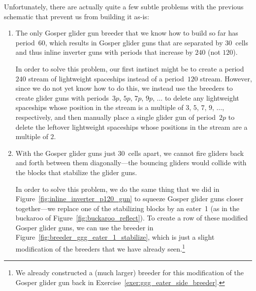 Unfortunately, there are actually quite a few subtle problems with the previous schematic that prevent us from building it as-is:\smallskip

\begin{enumerate}
	\item[1)] The only Gosper glider gun breeder that we know how to build so far has period~$60$, which results in Gosper glider guns that are separated by $30$~cells and thus inline inverter guns with periods that increase by $240$ (not $120$).
	
	In order to solve this problem, our first instinct might be to create a period~$240$ stream of lightweight spaceships instead of a period~$120$ stream. However, since we do not yet know how to do this, we instead use the breeders to create glider guns with periods~$3p$, $5p$, $7p$, $9p$, $\ldots$ to delete any lightweight spaceships whose position in the stream is a multiple of $3$, $5$, $7$, $9$, $\ldots$, respectively, and then manually place a single glider gun of period~$2p$ to delete the leftover lightweight spaceships whose positions in the stream are a multiple of $2$.\smallskip
	
	\item[2)] With the Gosper glider guns just $30$~cells apart, we cannot fire gliders back and forth between them diagonally---the bouncing gliders would collide with the blocks that stabilize the glider guns.
	
	In order to solve this problem, we do the same thing that we did in Figure~\ref{fig:inline_inverter_p120_gun} to squeeze Gosper glider guns closer together---we replace one of the stabilizing blocks by an eater~1 (as in the buckaroo of Figure~\ref{fig:buckaroo_reflect}). To create a row of these modified Gosper glider guns, we can use the breeder in Figure~\ref{fig:breeder_ggg_eater_1_stabilize}, which is just a slight modification of the breeders that we have already seen.\footnote{We already constructed a (much larger) breeder for this modification of the Gosper glider gun back in Exercise~\ref{exer:ggg_eater_side_breeder}.}\bigskip
	
	\noindent\begin{minipage}{\linewidth}
		\centering
		\label{fig:breeder_ggg_eater_1_stabilize}\bigskip
	\end{minipage}
	

\end{enumerate}
